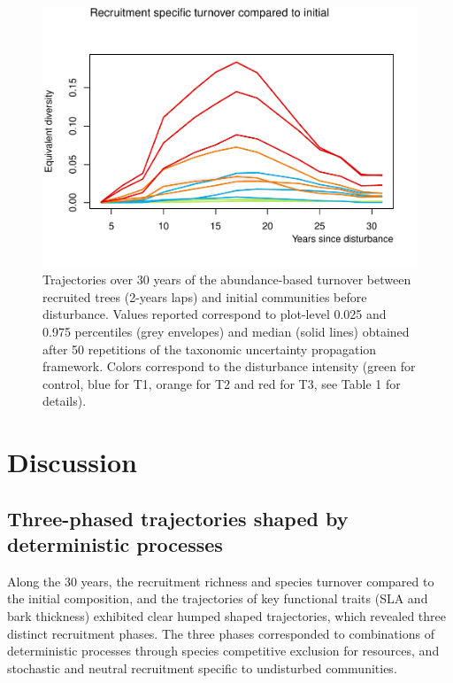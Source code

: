 \documentclass[fleqn,10pt]{ArtEcoFoG} %
\begin{document}
\begin{figure}

{\centering \includegraphics{RecruitmentTrajectories_files/figure-latex/Turnover-1} 

}

\caption{Trajectories over 30 years of the abundance-based turnover between recruited trees (2-years laps) and initial communities before disturbance. Values reported correspond to plot-level 0.025 and 0.975 percentiles (grey envelopes) and median (solid lines) obtained after 50 repetitions of the taxonomic uncertainty propagation framework. Colors correspond to the disturbance intensity (green for control, blue for T1, orange for T2 and red for T3, see Table 1 for details).}\label{fig:Turnover}
\end{figure}

\section{Discussion}\label{discussion}

\subsection{Three-phased trajectories shaped by deterministic
processes}\label{three-phased-trajectories-shaped-by-deterministic-processes}

Along the 30 years, the recruitment richness and species turnover
compared to the initial composition, and the trajectories of key
functional traits (SLA and bark thickness) exhibited clear humped shaped
trajectories, which revealed three distinct recruitment phases. The
three phases corresponded to combinations of deterministic processes
through species competitive exclusion for resources, and stochastic and
neutral recruitment specific to undisturbed communities.
\end{document}
